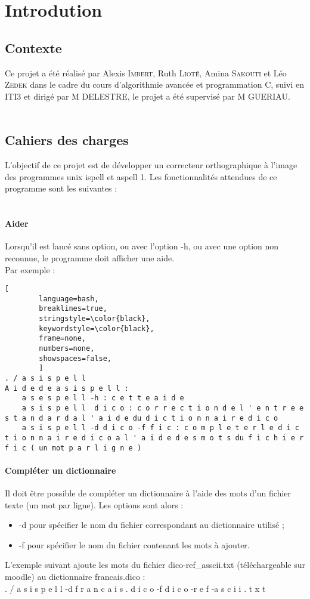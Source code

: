 \section{Introdution}
\subsection{Contexte}
Ce projet a été réalisé par Alexis \textsc{Imbert}, Ruth \textsc{Lioté}, Amina \textsc{Sakouti} et Léo \textsc{Zedek} dans le cadre du cours d'algorithmie avancée et programmation C, suivi en ITI3 et dirigé par M DELESTRE, le projet a été supervisé par M GUERIAU.\\
\\
\subsection{Cahiers des charges}
L'objectif de ce projet est de développer un correcteur orthographique à l'image des programmes unix ispell et aspell 1. Les fonctionnalités attendues de ce programme sont les suivantes :\\
\\
\paragraph{Aider}
Lorsqu'il est lancé sans option, ou avec l'option -h, ou avec une option non reconnue, le programme doit afficher une aide.\\
Par exemple :
\begin{lstlisting}[
		language=bash,
		breaklines=true,
		stringstyle=\color{black},
		keywordstyle=\color{black},
		frame=none,
		numbers=none,
		showspaces=false,
		]
. / a s i s p e l l
A i d e d e a s i s p e l l :
	a s e s p e l l -h : c e t t e a i d e
	a s i s p e l l	 d i c o : c o r r e c t i o n d e l ' e n t r e e s t a n d a r d a l ' a i d e du d i c t i o n n a i r e d i c o
	a s i s p e l l -d d i c o -f f i c : c o m p l e t e r l e d i c t i o n n a i r e d i c o a l ' a i d e d e s m o t s du f i c h i e r f i c ( un mot p a r l i g n e )
\end{lstlisting}
\paragraph{Compléter un dictionnaire}
Il doit être possible de compléter un dictionnaire à l'aide des mots d'un fichier texte (un mot par ligne). Les options sont alors :
\begin{itemize}
\item -d pour spécifier le nom du fichier correspondant au dictionnaire utilisé ;
\item -f pour spécifier le nom du fichier contenant les mots à ajouter.
\end{itemize}
L'exemple suivant ajoute les mots du fichier dico-ref\_asscii.txt (téléchargeable sur moodle) au dictionnaire francais.dico :\\
. / a s i s p e l l -d f r a n c a i s . d i c o -f d i c o -r e f -a s c i i . t x t\\
\\

